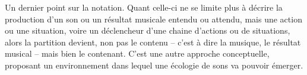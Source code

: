 \documentclass{article}
\begin{document}

Un dernier point sur la notation. Quant celle-ci ne se limite plus à décrire la production d'un son ou un résultat musicale entendu ou attendu, mais une action ou une situation, voire un déclencheur d'une chaine d'actions ou de situations, alors la partition devient, non pas le contenu -- c'est à dire la musique, le résultat musical -- mais bien le contenant. C'est une autre approche conceptuelle, proposant un environnement dans lequel une écologie de sons va pouvoir émerger. 
 

%


%
%
\end{document}
